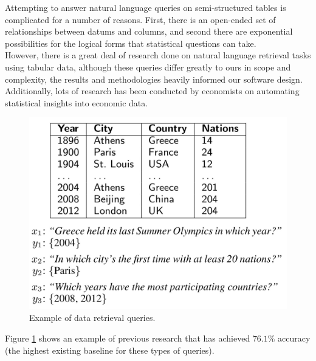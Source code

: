 \documentclass[pageno]{jpaper}
\begin{document}
Attempting to answer natural language queries on semi-structured tables is complicated for a number of reasons. First, there is an open-ended set of relationships between datums and columns, and second there are exponential possibilities for the logical forms that statistical questions can take. \\
However, there is a great deal of research done on natural language retrieval tasks using tabular data, although these queries differ greatly to ours in scope and complexity, the results and methodologies heavily informed our software design. Additionally, lots of research has been conducted by economists on automating statistical insights into economic data. 

\begin{figure}[!hbt]
\centering
\includegraphics[width=0.75\linewidth]{imgs/comp_semantic_parsing.jpeg}
\caption{Example of data retrieval queries.}
\label{fig:retri}
\end{figure}

Figure \ref{fig:retri} shows an example of previous research that has achieved $76.1\%$ accuracy (the highest existing baseline for these types of queries). 
\end{document}
